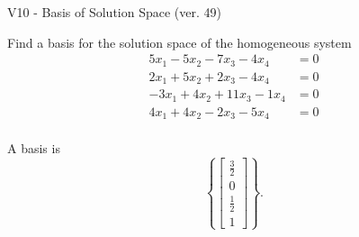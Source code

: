 \begin{exercise}
  \begin{exerciseTitle}V10 - Basis of Solution Space (ver. 49)\end{exerciseTitle}
  \begin{exerciseStatement}
    Find a basis for the solution space of the homogeneous system 
\begin{align*}
 5 x_ 1 -5 x_ 2 -7 x_ 3 -4 x_ 4 &= 0  \\ 
  2 x_ 1 + 5 x_ 2 + 2 x_ 3 -4 x_ 4 &= 0  \\ 
  -3 x_ 1 + 4 x_ 2 + 11 x_ 3 -1 x_ 4 &= 0  \\ 
  4 x_ 1 + 4 x_ 2 -2 x_ 3 -5 x_ 4 &= 0  \\ 
 \end{align*}


 
  \end{exerciseStatement}

  \begin{exerciseAnswer}
   A basis is   
\[\left\{\left[\begin{array}{c}
\frac{3}{2} \\
0 \\
\frac{1}{2} \\
1
\end{array}\right]\right\}.\]

  


  \end{exerciseAnswer}
\end{exercise}